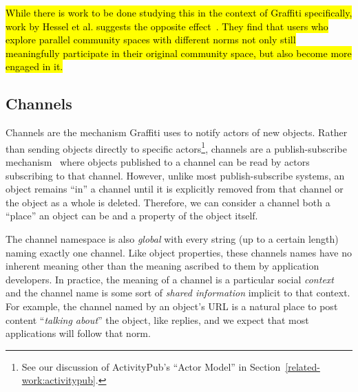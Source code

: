 \hl{%
While there is work to be done studying this in the context of Graffiti specifically,
work by Hessel et al.
suggests the opposite effect~{\cite{highlyrelatedcommunities}}.
They find that users who explore parallel community spaces
with different norms not only still meaningfully participate in their original community space,
but also become more engaged in it.
}%





\subsection{Channels}
\label{concepts:channels}

Channels are the mechanism Graffiti uses to notify
actors of new objects.
Rather than sending objects directly to specific actors\footnote{
    See our discussion of ActivityPub's ``Actor Model'' in Section~\ref{related-work:activitypub}.
},
channels are a publish-subscribe mechanism~\cite{pubsub}
where objects published to a channel
can be read by actors subscribing to that channel.
However, unlike most publish-subscribe systems,
an object remains ``in'' a channel until
it is explicitly removed from that channel
or the object as a whole is deleted.
Therefore, we can consider a channel both a ``place''
an object can be and a property of the object itself.

The channel namespace is also \emph{global} with every string (up to a certain length)
naming exactly one channel.
Like object properties, these channels names have no inherent meaning
other than the meaning ascribed to them by application developers.
In practice, the meaning of a channel is a particular social \emph{context} and the channel
name is some sort of \emph{shared information} implicit to that context.
For example, the channel named by an object's URL is a natural place to post content ``\emph{talking about}'' the object, like replies, and we expect that most applications will follow that norm.

